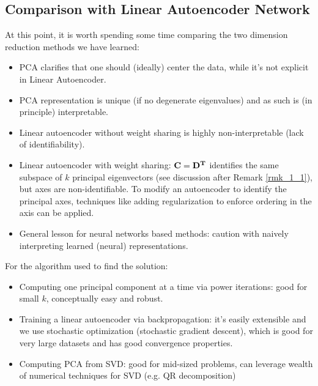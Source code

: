 \documentclass[../main.tex]{subfiles}
\begin{document}
\subsection{Comparison with Linear Autoencoder Network}
At this point, it is worth spending some time comparing the two dimension reduction methods we have learned:
\begin{itemize}
	\item PCA clarifies that one should (ideally) center the data, while it's not explicit in Linear Autoencoder.
	\item PCA representation is unique (if no degenerate eigenvalues) and as such is (in principle) interpretable.
	\item Linear autoencoder without weight sharing is highly non-interpretable (lack of identifiability).
	\item Linear autoencoder with weight sharing: ${\bf C=D^T}$ identifies the same subspace of $k$ principal eigenvectors (see discussion after Remark \ref{rmk_1_1}), but axes are non-identifiable. To modify an autoencoder to identify the principal axes, techniques like adding regularization to enforce ordering in the axis can be applied.
	\item General lesson for neural networks based methods: caution with naively interpreting learned (neural) representations.
\end{itemize}
\par For the algorithm used to find the solution:
\begin{itemize}
	\item Computing one principal component at a time via power iterations: good for small $k$, conceptually easy and robust.
	\item Training a linear autoencoder via backpropagation: it's easily extensible and we use stochastic optimization (stochastic gradient descent), which is good for very large datasets and has good convergence properties.
	\item Computing PCA from SVD: good for mid-sized problems, can leverage wealth of numerical techniques for SVD (e.g. QR decomposition)
\end{itemize}
\end{document}
